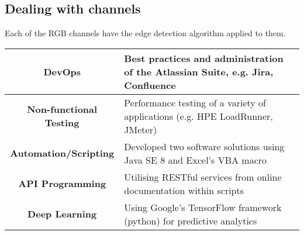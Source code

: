 \documentclass[11pt]{article}
\begin{document}
\subsection{Dealing with channels}
Each of the RGB channels have the edge detection algorithm applied to them. \\



\begin{table}[h]
\begin{center}
\begin{tabular}{|c|l|}
\hline
{\bf DevOps} & Best practices and administration of the Atlassian Suite, e.g. Jira, Confluence\\
\hline
{\bf Non-functional Testing} & Performance testing of a variety of applications (e.g. HPE LoadRunner, JMeter)\\
\hline
{\bf Automation/Scripting} & Developed two software solutions using Java SE 8 and Excel's VBA macro\\
\hline
{\bf API Programming} & Utilising RESTful services from online documentation within scripts\\
\hline
{\bf Deep Learning} & Using Google's TensorFlow framework (python) for predictive analytics\\
\hline
\end{tabular}
\end{center}
\label{default}
\end{table}
\end{document}
